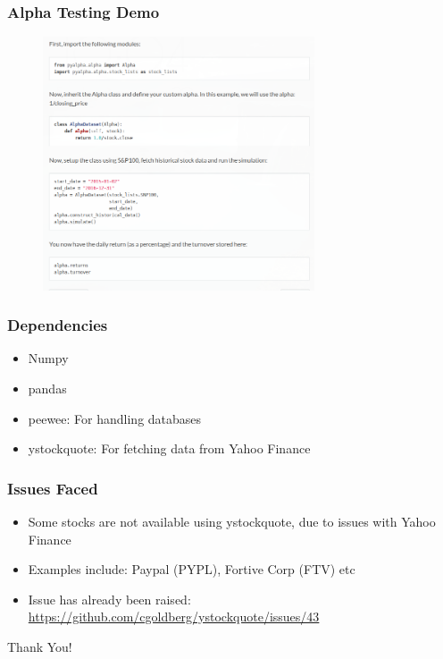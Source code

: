 \documentclass[serif,mathserif]{beamer}
\begin{document}
    \begin{frame}

        \frametitle{Alpha Testing Demo}

        \begin{figure}[h]
            \centering
            \includegraphics[height=7.5cm]{alpha_tutorial.png}
        \end{figure}

    \end{frame}

    \begin{frame}

        \frametitle{Dependencies}

        \begin{itemize}
            \item Numpy
            \item pandas
            \item peewee: For handling databases
            \item ystockquote: For fetching data from Yahoo Finance
        \end{itemize}

    \end{frame}

    \begin{frame}
        \frametitle{Issues Faced}

        \begin{itemize}
            \item Some stocks are not available using ystockquote, due to issues with Yahoo Finance
            \item Examples include: Paypal (PYPL), Fortive Corp (FTV) etc
            \item Issue has already been raised: \url{https://github.com/cgoldberg/ystockquote/issues/43}
        \end{itemize}
    \end{frame}

    \begin{frame}
        \centering \huge{Thank You!}
    \end{frame}
\end{document}

